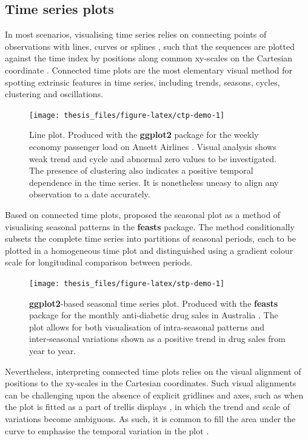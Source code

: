 \documentclass{aucklandthesis}
\begin{document}
\hypertarget{time-series-plots}{%
\subsection{Time series plots}\label{time-series-plots}}

In most scenarios, visualising time series relies on connecting points of observations with lines, curves or splines \autocite{dataviz-ts}, such that the sequences are plotted against the time index by positions along common xy-scales on the Cartesian coordinate \autocite{fpp3}. Connected time plots are the most elementary visual method for spotting extrinsic features in time series, including trends, seasons, cycles, clustering and oscillations.

\begin{figure}
\texttt{[image: thesis\_files/figure-latex/ctp-demo-1]} \caption{Line plot. Produced with the \textbf{ggplot2} package \autocite{ggplot2} for the weekly economy passenger load on Ansett Airlines \autocite{fpp3d}. Visual analysis shows weak trend and cycle and abnormal zero values to be investigated. The presence of clustering also indicates a positive temporal dependence in the time series. It is nonetheless uneasy to align any observation to a date accurately.}\label{fig:ctp-demo}
\end{figure}



Based on connected time plots, \textcite{feasts} proposed the seasonal plot as a method of visualising seasonal patterns in the \textbf{feasts} package. The method conditionally subsets the complete time series into partitions of seasonal periods, each to be plotted in a homogeneous time plot and distinguished using a gradient colour scale for longitudinal comparison between periods.

\begin{figure}
\texttt{[image: thesis\_files/figure-latex/stp-demo-1]} \caption{\textbf{ggplot2}-based seasonal time series plot. Produced with the \textbf{feasts} package for the monthly anti-diabetic drug sales in Australia \autocite{fpp3d}. The plot allows for both visualisation of intra-seasonal patterns and inter-seasonal variations shown as a positive trend in drug sales from year to year.}\label{fig:stp-demo}
\end{figure}



Nevertheless, interpreting connected time plots relies on the visual alignment of positions to the xy-scales in the Cartesian coordinates. Such visual alignments can be challenging upon the absence of explicit gridlines and axes, such as when the plot is fitted as a part of trellis displays \autocite{trellis}, in which the trend and scale of variations become ambiguous. As such, it is common to fill the area under the curve to emphasise the temporal variation in the plot \autocite{dataviz-ts}.
\end{document}
